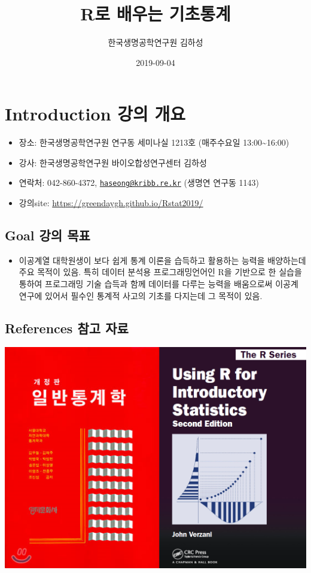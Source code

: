 \documentclass[]{book}
\title{R로 배우는 기초통계}
\author{한국생명공학연구원 김하성}
\date{2019-09-04}
\providecommand{\tightlist}{%
  \setlength{\itemsep}{0pt}\setlength{\parskip}{0pt}}
\begin{document}
\maketitle

{
\setcounter{tocdepth}{1}
\tableofcontents
}
\hypertarget{introduction--}{%
\chapter{Introduction 강의 개요}\label{introduction--}}

\begin{itemize}
\tightlist
\item
  장소: 한국생명공학연구원 연구동 세미나실 1213호 (매주수요일 13:00\textasciitilde{}16:00)
\item
  강사: 한국생명공학연구원 바이오합성연구센터 김하성
\item
  연락처: 042-860-4372, \href{mailto:haseong@kribb.re.kr}{\nolinkurl{haseong@kribb.re.kr}} (생명연 연구동 1143)
\item
  강의site: \url{https://greendaygh.github.io/Rstat2019/}
\end{itemize}

\hypertarget{goal--}{%
\section{Goal 강의 목표}\label{goal--}}

\begin{itemize}
\tightlist
\item
  이공계열 대학원생이 보다 쉽게 통계 이론을 습득하고 활용하는 능력을 배양하는데 주요 목적이 있음. 특히 데이터 분석용 프로그래밍언어인 R을 기반으로 한 실습을 통하여 프로그래밍 기술 습득과 함께 데이터를 다루는 능력을 배움으로써 이공계 연구에 있어서 필수인 통계적 사고의 기초를 다지는데 그 목적이 있음.
\end{itemize}

\hypertarget{references--}{%
\section{References 참고 자료}\label{references--}}

\includegraphics{images/01-15.PNG}
\end{document}
